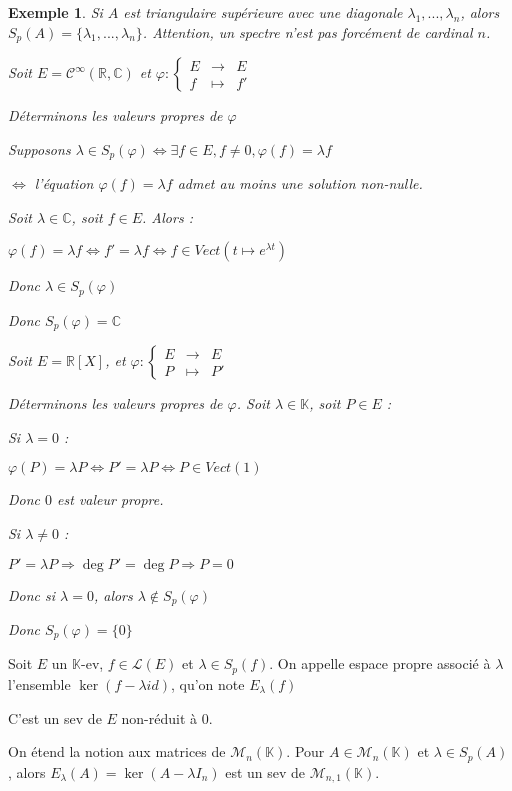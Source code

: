 \documentclass[a4paper,12pt]{book}
\newcommand{\Def}[2]{\begin{tcolorbox}[sharp corners, colback=white,colframe=blue!90!black!75, title=Définition : #1]#2\end{tcolorbox}}
\newtheorem{Exe}{Exemple}[section]
\def\R{\mathbb{R}}
\def\C{\mathbb{C}}
\def\K{\mathbb{K}}
\begin{document}
\begin{Exe}
Si $A$ est triangulaire supérieure avec une diagonale $\lambda_1,..., \lambda_n$, alors $S_p(A)=\{\lambda_1,...,\lambda_n\}$. Attention, un spectre n'est pas forcément de cardinal $n$.
\par Soit $E=\mathcal{C}^\infty(\R,\C)$ et $\varphi:\left\{\begin{array}{rcl} E & \to & E \\ f & \mapsto & f' \end{array}\right.$ \par Déterminons les valeurs propres de $\varphi$ \par Supposons $\lambda\in S_p(\varphi) \Leftrightarrow \exists f\in E, f\neq 0, \varphi(f)=\lambda f$ \par $\Leftrightarrow$ l'équation $\varphi(f)=\lambda f$ admet au moins une solution non-nulle. \par Soit $\lambda\in\C$, soit $f\in E$. Alors : \par $\varphi(f)=\lambda f \Leftrightarrow f'=\lambda f \Leftrightarrow f\in Vect(t\mapsto e^{\lambda t})$ \par Donc $\lambda \in S_p(\varphi)$ \par Donc $S_p(\varphi)=\C$
\par Soit $E=\R[X]$, et $\varphi:\left\{\begin{array}{rcl} E & \to & E \\ P & \mapsto & P' \end{array}\right.$ \par Déterminons les valeurs propres de $\varphi$. Soit $\lambda\in\K$, soit $P\in E$ : \par Si $\lambda=0$ : \par $\varphi(P)=\lambda P \Leftrightarrow P'=\lambda P \Leftrightarrow P\in Vect(1)$ \par Donc $0$ est valeur propre. \par Si $\lambda\neq 0$ : \par $P'=\lambda P \Rightarrow \deg P'=\deg P \Rightarrow P=0$ \par Donc si $\lambda =0$, alors $\lambda\notin S_p(\varphi)$ \par Donc $S_p(\varphi)=\{0\}$
\end{Exe}
\Def{Espace propre}{Soit $E$ un $\K$-ev, $f\in\mathcal{L}(E)$ et $\lambda\in S_p(f)$. On appelle espace propre associé à $\lambda$ l'ensemble $\ker (f-\lambda id)$, qu'on note $E_\lambda(f)$ \par C'est un sev de $E$ non-réduit à $0$. \par On étend la notion aux matrices de $\mathcal{M}_n(\K)$. Pour $A\in\mathcal{M}_n(\K)$ et $\lambda\in S_p(A)$, alors $E_\lambda(A) = \ker (A-\lambda I_n)$ est un sev de $\mathcal{M}_{n,1}(\K)$.}
\end{document}
